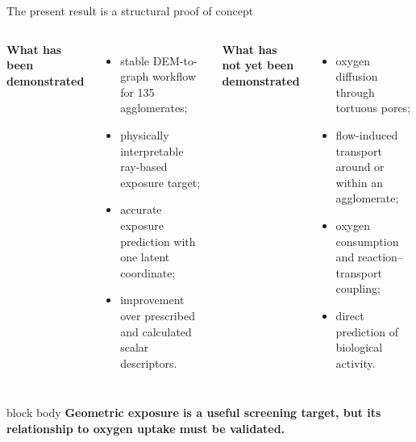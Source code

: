 \documentclass[aspectratio=169,11pt]{beamer}
\newcommand{\hi}[1]{\textcolor{tumblue}{\textbf{#1}}}
\newcommand{\takeaway}[1]{%
	\begin{beamercolorbox}[rounded=true,sep=.55em]{block body}
		\centering\color{tumdark}\textbf{#1}
\end{beamercolorbox}}
\begin{document}
\begin{frame}{The present result is a structural proof of concept}
  \begin{columns}[T,onlytextwidth]
      \hi{What has been demonstrated}
      \begin{itemize}
        \item stable DEM-to-graph workflow for 135 agglomerates;
        \item physically interpretable ray-based exposure target;
        \item accurate exposure prediction with one latent coordinate;
        \item improvement over prescribed and calculated scalar descriptors.
      \end{itemize}
      \hi{What has not yet been demonstrated}
      \begin{itemize}
        \item oxygen diffusion through tortuous pores;
        \item flow-induced transport around or within an agglomerate;
        \item oxygen consumption and reaction--transport coupling;
        \item direct prediction of biological activity.
      \end{itemize}
  \end{columns}
  \vspace{.3cm}
  \takeaway{Geometric exposure is a useful screening target, but its relationship to oxygen uptake must be validated.}
\end{frame}
\end{document}
